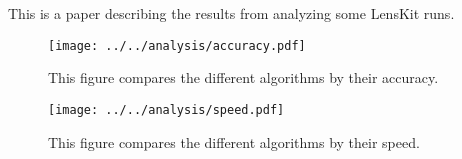 \documentclass{article}
\begin{document}
This is a paper describing the results from analyzing some LensKit runs.

\begin{figure}
\begin{center}
\texttt{[image: ../../analysis/accuracy.pdf]}
\caption{This figure compares the different algorithms by their accuracy.}
\end{center}
\end{figure}

\begin{figure}  
\begin{center}
\texttt{[image: ../../analysis/speed.pdf]}
\caption{This figure compares the different algorithms by their speed.}
\end{center}
\end{figure}
\end{document}

